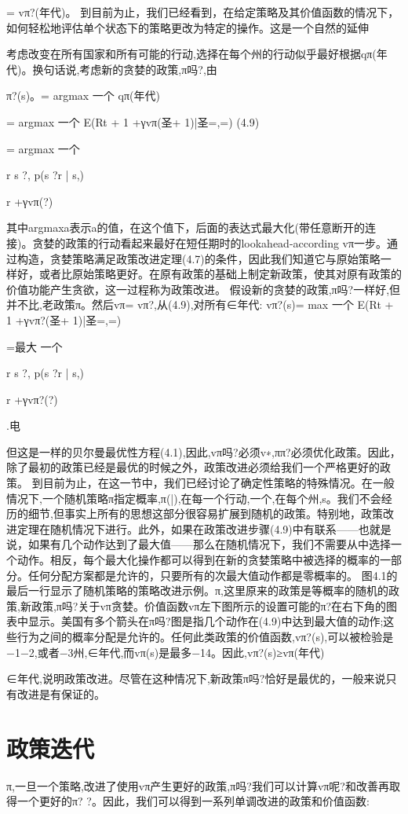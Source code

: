 = vπ?(年代)。
到目前为止，我们已经看到，在给定策略及其价值函数的情况下，如何轻松地评估单个状态下的策略更改为特定的操作。这是一个自然的延伸

考虑改变在所有国家和所有可能的行动,选择在每个州的行动似乎最好根据qπ(年代)。换句话说,考虑新的贪婪的政策,π吗?,由

π?(s)。= argmax
一个
qπ(年代)

= argmax
一个
E(Rt + 1 +γvπ(圣+ 1)|圣=,=) 					(4.9)

= argmax
一个

r s ?,
p(s ?r | s,)

r +γvπ(?)

其中argmaxa表示a的值，在这个值下，后面的表达式最大化(带任意断开的连接)。贪婪的政策的行动看起来最好在短任期时的lookahead-according vπ一步。通过构造，贪婪策略满足政策改进定理(4.7)的条件，因此我们知道它与原始策略一样好，或者比原始策略更好。在原有政策的基础上制定新政策，使其对原有政策的价值功能产生贪欲，这一过程称为政策改进。
假设新的贪婪的政策,π吗?一样好,但并不比,老政策π。然后vπ= vπ?,从(4.9),对所有∈年代:
vπ?(s)= max
一个
E(Rt + 1 +γvπ?(圣+ 1)|圣=,=)

=最大
一个

r s ?,
p(s ?r | s,)

r +γvπ?(?)

.电

但这是一样的贝尔曼最优性方程(4.1),因此,vπ吗?必须v∗,ππ?必须优化政策。因此，除了最初的政策已经是最优的时候之外，政策改进必须给我们一个严格更好的政策。
到目前为止，在这一节中，我们已经讨论了确定性策略的特殊情况。在一般情况下,一个随机策略π指定概率,π(|),在每一个行动,一个,在每个州,s。我们不会经历的细节,但事实上所有的思想这部分很容易扩展到随机的政策。特别地，政策改进定理在随机情况下进行。此外，如果在政策改进步骤(4.9)中有联系——也就是说，如果有几个动作达到了最大值——那么在随机情况下，我们不需要从中选择一个动作。相反，每个最大化操作都可以得到在新的贪婪策略中被选择的概率的一部分。任何分配方案都是允许的，只要所有的次最大值动作都是零概率的。
图4.1的最后一行显示了随机策略的策略改进示例。π,这里原来的政策是等概率的随机的政策,新政策,π吗?关于vπ贪婪。价值函数vπ左下图所示的设置可能的π?在右下角的图表中显示。美国有多个箭头在π吗?图是指几个动作在(4.9)中达到最大值的动作;这些行为之间的概率分配是允许的。任何此类政策的价值函数,vπ?(s),可以被检验是−1−2,或者−3州,∈年代,而vπ(s)是最多−14。因此,vπ?(s)≥vπ(年代)

∈年代,说明政策改进。尽管在这种情况下,新政策π吗?恰好是最优的，一般来说只有改进是有保证的。


\section{政策迭代}
π,一旦一个策略,改进了使用vπ产生更好的政策,π吗?我们可以计算vπ呢?和改善再取得一个更好的π? ?。因此，我们可以得到一系列单调改进的政策和价值函数:


